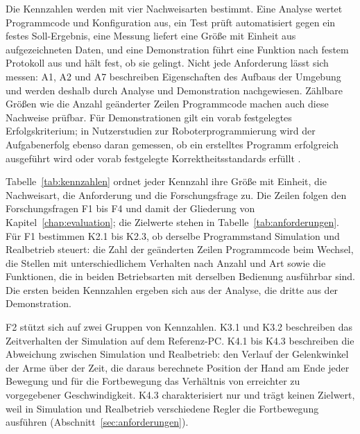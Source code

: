 Die Kennzahlen werden mit vier Nachweisarten bestimmt.
Eine Analyse wertet Programmcode und Konfiguration aus, ein Test prüft automatisiert gegen ein festes Soll-Ergebnis, eine Messung liefert eine Größe mit Einheit aus aufgezeichneten Daten, und eine Demonstration führt eine Funktion nach festem Protokoll aus und hält fest, ob sie gelingt.
Nicht jede Anforderung lässt sich messen: A1, A2 und A7 beschreiben Eigenschaften des Aufbaus der Umgebung und werden deshalb durch Analyse und Demonstration nachgewiesen.
Zählbare Größen wie die Anzahl geänderter Zeilen Programmcode machen auch diese Nachweise prüfbar.
Für Demonstrationen gilt ein vorab festgelegtes Erfolgskriterium; in Nutzerstudien zur Roboterprogrammierung wird der Aufgabenerfolg ebenso daran gemessen, ob ein erstelltes Programm erfolgreich ausgeführt wird oder vorab festgelegte Korrektheitsstandards erfüllt \cite{Ajaykumar2021}.

Tabelle~\ref{tab:kennzahlen} ordnet jeder Kennzahl ihre Größe mit Einheit, die Nachweisart, die Anforderung und die Forschungsfrage zu.
Die Zeilen folgen den Forschungsfragen F1 bis F4 und damit der Gliederung von Kapitel~\ref{chap:evaluation}; die Zielwerte stehen in Tabelle~\ref{tab:anforderungen}.
Für F1 bestimmen K2.1 bis K2.3, ob derselbe Programmstand Simulation und Realbetrieb steuert: die Zahl der geänderten Zeilen Programmcode beim Wechsel, die Stellen mit unterschiedlichem Verhalten nach Anzahl und Art sowie die Funktionen, die in beiden Betriebsarten mit derselben Bedienung ausführbar sind.
Die ersten beiden Kennzahlen ergeben sich aus der Analyse, die dritte aus der Demonstration.

F2 stützt sich auf zwei Gruppen von Kennzahlen.
K3.1 und K3.2 beschreiben das Zeitverhalten der Simulation auf dem Referenz-PC.
K4.1 bis K4.3 beschreiben die Abweichung zwischen Simulation und Realbetrieb: den Verlauf der Gelenkwinkel der Arme über der Zeit, die daraus berechnete Position der Hand am Ende jeder Bewegung und für die Fortbewegung das Verhältnis von erreichter zu vorgegebener Geschwindigkeit.
K4.3 charakterisiert nur und trägt keinen Zielwert, weil in Simulation und Realbetrieb verschiedene Regler die Fortbewegung ausführen (Abschnitt~\ref{sec:anforderungen}).

